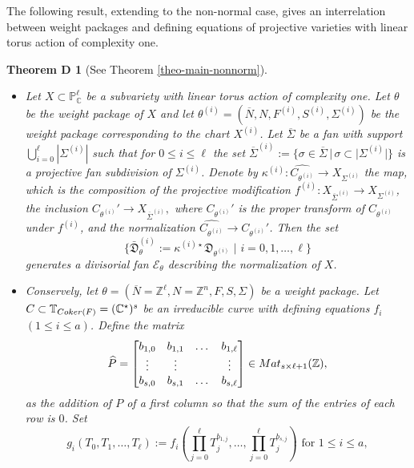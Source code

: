 \documentclass[11pt, reqno]{amsart}
\theoremstyle{plain}
\newtheorem*{thmD}{Theorem D}
\theoremstyle{definition}
\theoremstyle{remark}
\begin{document}
The following result, extending \cite[Section 4]{AIPSV12} to the non-normal case, gives an interrelation between
weight packages and defining equations of  projective varieties with linear torus action of complexity one. 
\begin{thmD}[See  Theorem \ref{theo-main-nonnorm}]\label{TheoC-TheoC}
\begin{itemize}
\item[(1)] Let $X\subset \mathbb{P}^{\ell}_{\mathbb{C}}$ be a subvariety with linear torus action of complexity one. Let $\theta$ be the weight package of $X$ and let $\theta^{(i)} =   (\overline{N}, N, F^{(i)}, S^{(i)}, \Sigma^{(i)})$ be the weight package corresponding to the chart $X^{(i)}$. 
Let $\overline{\Sigma}$ be a fan with support $\bigcup_{i =  0}^{\ell}|\Sigma^{(i)}|$ such that for $0\leq i\leq \ell$
the set
$\overline{\Sigma}^{(i)} :=  \{\sigma \in \overline{\Sigma}\,|\, \sigma \subset |\Sigma^{(i)}|\}$
is a projective fan subdivision of $\Sigma^{(i)}$. Denote by $\kappa^{(i)}: \widehat{C_{\theta^{(i)}}}\rightarrow X_{\Sigma^{(i)}}$ the map, which is the composition of the projective modification $f^{(i)}: X_{\overline{\Sigma}^{(i)}}\rightarrow X_{\Sigma^{(i)}}$, the inclusion $C_{\theta^{(i)}}'\rightarrow X_{\overline{\Sigma}^{(i)}},$ where $C_{\theta^{(i)}}'$ is the proper transform of $C_{\theta^{(i)}}$ under $f^{(i)}$, and the normalization 
$\widehat{C_{\theta^{(i)}}}\rightarrow C_{\theta^{(i)}}'$. 
Then the set
$$\{\bar{\mathfrak{D}}_{\theta}^{(i)} :=  \kappa^{(i) \star}\mathfrak{D}_{\theta^{(i)}}\,\,|\,\, i =  0,1, \ldots, \ell\}$$
generates  a divisorial fan $\mathscr{E}_{\theta}$ describing the normalization of $X$.
\item[(2)] Conservely, let $\theta =  (\overline{N} =  \mathbb{Z}^{\ell}, N =  \mathbb{Z}^{n}, F, S, \Sigma)$ be a weight package. Let $C\subset \mathbb{T}_{{\rm Coker}(F)} =  (\mathbb{C}^{\star})^{s}$ be an irreducible curve with defining equations $f_{i}$  $(1\leq i\leq a)$.
Define the matrix
$$\widehat{P} =   \begin{bmatrix} 
    b_{1,0} & b_{1,1} & \dots & b_{1, \ell}\\
    \vdots &  \vdots &     & \vdots  \\
    b_{s, 0} & b_{s,1} & \dots & b_{s, \ell}
    \end{bmatrix}\in {\rm Mat}_{s\times \ell + 1}(\mathbb{Z}),$$
as the addition of $P$ of a first column so that the sum of the entries of each row is $0$. Set 
$$g_{i}(T_{0},T_{1}, \ldots, T_{\ell}):= f_{i}\left(\prod_{j = 0}^{\ell}T_{j}^{b_{1, j}}, \ldots, \prod_{j = 0}^{\ell}T_{j}^{b_{s, j}}\right)\text{ for } 1\leq i\leq a,$$

\end{itemize}
\end{thmD}
\end{document}
